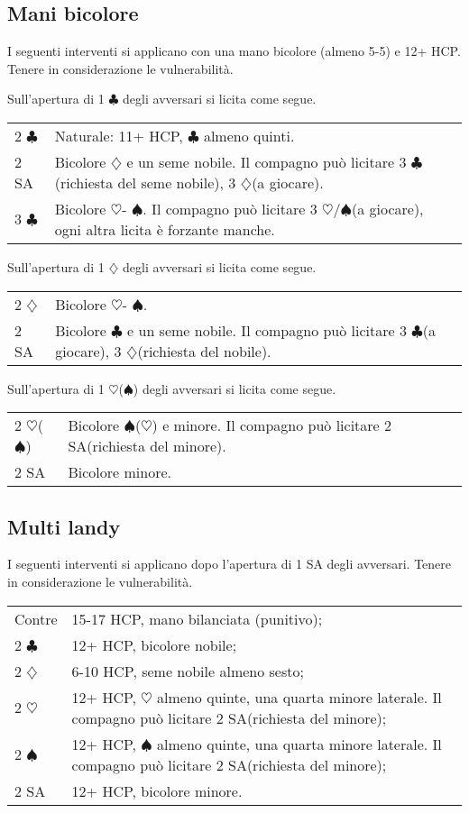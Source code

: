\documentclass[a4paper,10pt]{article}
\renewcommand{\c}{$\clubsuit$\xspace}
\renewcommand{\d}{$\diamondsuit$\xspace}
\newcommand{\h}{$\heartsuit$\xspace}
\newcommand{\s}{$\spadesuit$\xspace}
\newcommand{\sa}{SA\xspace}
\newcommand{\smallspace}{\vskip0.3cm}
\newenvironment{twocol}
  {\smallspace\noindent\begin{tabular}{l p{0.78\textwidth}}}
  {\end{tabular}\smallspace}
\begin{document}
\subsection{Mani bicolore}

I seguenti interventi si applicano con una mano bicolore (almeno 5-5) e 12+ HCP. Tenere in considerazione le vulnerabilità.

Sull'apertura di 1 \c degli avversari si licita come segue.
\begin{twocol}
  2 \c & Naturale: 11+ HCP, \c almeno quinti.\\
  2 \sa & Bicolore \d e un seme nobile. Il compagno può licitare 3 \c (richiesta del seme nobile), 3 \d (a giocare).\\
  3 \c & Bicolore \h - \s. Il compagno può licitare 3 \h/\s (a giocare), ogni altra licita è forzante manche.
\end{twocol}

Sull'apertura di 1 \d degli avversari si licita come segue.
\begin{twocol}
  2 \d & Bicolore \h - \s.\\
  2 \sa & Bicolore \c e un seme nobile. Il compagno può licitare 3 \c (a giocare), 3 \d (richiesta del nobile).
\end{twocol}

Sull'apertura di 1 \h (\s) degli avversari si licita come segue.
\begin{twocol}
  2 \h (\s) & Bicolore \s (\h) e minore. Il compagno può licitare 2 \sa (richiesta del minore).\\
  2 \sa & Bicolore minore.
\end{twocol}

\subsection{Multi landy}

I seguenti interventi si applicano dopo l'apertura di 1 \sa degli avversari. Tenere in considerazione le vulnerabilità.
\begin{twocol}
 Contre & 15-17 HCP, mano bilanciata (punitivo);\\
 2 \c & 12+ HCP, bicolore nobile;\\
 2 \d & 6-10 HCP, seme nobile almeno sesto;\\
 2 \h & 12+ HCP, \h almeno quinte, una quarta minore laterale. Il compagno può licitare 2 \sa (richiesta del minore);\\
 2 \s & 12+ HCP, \s almeno quinte, una quarta minore laterale. Il compagno può licitare 2 \sa (richiesta del minore);\\
 2 \sa & 12+ HCP, bicolore minore.\\
\end{twocol}
\end{document}
